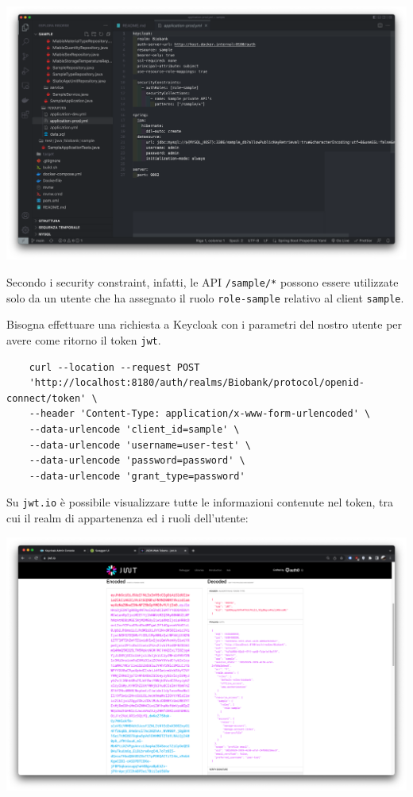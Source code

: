 \documentclass{article}
\begin{document}
\begin{center}
    \includegraphics[width=0.80\linewidth]{keycloak_16.png}
\end{center}

Secondo i security constraint, infatti, le API \texttt{/sample/*} possono essere utilizzate solo da un utente che ha assegnato il ruolo \texttt{role-sample} relativo al client \texttt{sample}.

Bisogna effettuare una richiesta a Keycloak con i parametri del nostro utente per avere come ritorno il token \texttt{jwt}.

\begin{verbatim}
    curl --location --request POST 
    'http://localhost:8180/auth/realms/Biobank/protocol/openid-connect/token' \
    --header 'Content-Type: application/x-www-form-urlencoded' \
    --data-urlencode 'client_id=sample' \
    --data-urlencode 'username=user-test' \
    --data-urlencode 'password=password' \
    --data-urlencode 'grant_type=password'
\end{verbatim}

Su \texttt{jwt.io} è possibile visualizzare tutte le informazioni contenute nel token, tra cui il realm di appartenenza ed i ruoli dell'utente:

\begin{center}
    \includegraphics[width=0.80\linewidth]{keycloak_17.png}
\end{center}
\end{document}

